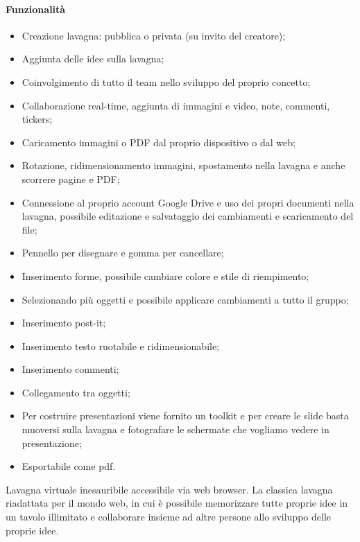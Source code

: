 \paragraph{Funzionalità}
\begin{itemize}
\item Creazione lavagna: pubblica o privata (su invito del creatore);
\item Aggiunta delle idee sulla lavagna;
\item Coinvolgimento di tutto il team nello sviluppo del proprio concetto;
\item Collaborazione real-time, aggiunta di immagini e video, note, commenti, tickers;
\item Caricamento immagini o PDF dal proprio dispositivo o dal web;
\item Rotazione, ridimensionamento immagini, spostamento nella lavagna e anche scorrere pagine e PDF;
\item Connessione al proprio account Google Drive e uso dei propri documenti nella lavagna, possibile editazione e salvataggio dei cambiamenti e scaricamento del file;
\item Pennello per disegnare e gomma per cancellare;
\item Inserimento forme, possibile cambiare colore e stile di riempimento;
\item Selezionando più oggetti e possibile applicare cambiamenti a tutto il gruppo;
\item Inserimento post-it;
\item Inserimento testo ruotabile e ridimensionabile;
\item Inserimento commenti;
\item Collegamento tra oggetti;
\item Per costruire presentazioni viene fornito un toolkit e per creare le slide basta muoversi sulla lavagna e fotografare le schermate che vogliamo vedere in presentazione;
\item Esportabile come pdf.
\end{itemize}
Lavagna virtuale inesauribile accessibile via web browser.
La classica lavagna riadattata per il mondo web, in cui è possibile memorizzare tutte proprie idee in un tavolo illimitato e collaborare insieme ad altre persone allo sviluppo delle proprie idee.

